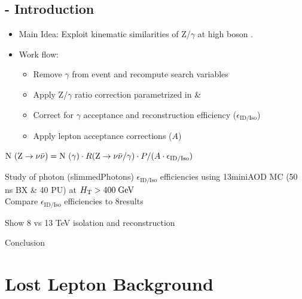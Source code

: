 \documentclass{beamer}
\begin{document}
\subsection{\photonJets - Introduction}
\begin{frame}
\begin{itemize}
 \item Main Idea: Exploit kinematic similarities of Z/$\gamma$ at high boson \pt.
 \item Work flow:
 \begin{itemize}
  \item Remove $\gamma$ from event and recompute search variables
  \item Apply Z/$\gamma$ ratio correction parametrized in \MHT \& \NJets
  \item Correct for $\gamma$ acceptance and reconstruction efficiency ($\epsilon_{\text{ID/Iso}}$)
  \item Apply lepton acceptance corrections ($A$)
 \end{itemize}
\end{itemize}
  \begin{centering}
  $\text{N }(\text{Z}\rightarrow\nu\bar{\nu}) = \text{N }(\gamma)\cdot R(\text{Z}\rightarrow\nu\bar{\nu}/\gamma)\cdot P/ (A\cdot \epsilon_{\text{ID/Iso}})$
  \end{centering}
\begin{block}{}
\centering
Study of photon (slimmedPhotons) $\epsilon_{\text{ID/Iso}}$ efficiencies using 13\tev miniAOD MC (50 ns BX \& 40 PU) at $H_{\text{T}}>400\;\text{Ge}\kern-0.06667em\text{V}$\\
Compare $\epsilon_{\text{ID/Iso}}$ efficiencies to 8\tev results
\end{block}

\end{frame}

\begin{frame}
Show 8 vs 13 TeV isolation and reconstruction
\end{frame}
\begin{frame}
 Conclusion
\end{frame}






\section{Lost Lepton Background }
\end{document}
